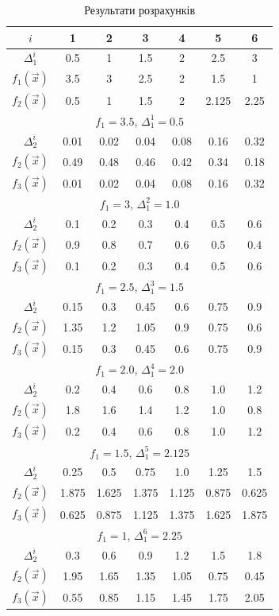 \clearpage
\begin{table}[H]        
    \caption{Результати розрахунків}
	\label{tab:result}
    \small
\begin{tabular}{c|cccccc}
	$i$ & 1 & 2 & 3 & 4 & 5 & 6 \\
	\hline
	$\Delta_1^i$ & 0.5 & 1 & 1.5 & 2 & 2.5 & 3 \\
	$f_1(\vec{x})$ & 3.5&	3	&2.5	&2	&1.5	&1 \\
	$f_2(\vec{x})$ & 0.5&	1	&1.5&	2	&2.125&	2.25 \\
	\hline
	\multicolumn{7}{c}{$f_1=3.5$, $\Delta_1^1=0.5$} \\
	\hline
	$\Delta_2^i$ & 0.01&	0.02&	0.04&	0.08&	0.16&	0.32 \\
	$f_2(\vec{x})$ & 0.49&	0.48&	0.46&	0.42&	0.34&	0.18 \\
	$f_3(\vec{x})$ & 0.01&	0.02&	0.04&	0.08&	0.16&	0.32 \\
	\hline
	\multicolumn{7}{c}{$f_1=3$, $\Delta_1^2=1.0$} \\
	\hline
	$\Delta_2^i$ & 0.1&	0.2&	0.3&	0.4&	0.5&	0.6 \\
	$f_2(\vec{x})$ & 0.9&	0.8&	0.7&	0.6&	0.5&	0.4 \\
	$f_3(\vec{x})$ & 0.1&	0.2&	0.3&	0.4&	0.5&	0.6 \\
	\hline
	\multicolumn{7}{c}{$f_1=2.5$, $\Delta_1^3=1.5$} \\
	\hline
	$\Delta_2^i$ & 0.15&	0.3&	0.45&	0.6&	0.75&	0.9 \\
	$f_2(\vec{x})$ & 1.35&	1.2&	1.05&	0.9&	0.75&	0.6 \\
	$f_3(\vec{x})$ & 0.15&	0.3&	0.45&	0.6&	0.75&	0.9 \\
	\hline
	\multicolumn{7}{c}{$f_1=2.0$, $\Delta_1^4=2.0$} \\
	\hline
	$\Delta_2^i$ & 0.2&	0.4&	0.6&	0.8&	1.0&	1.2 \\
	$f_2(\vec{x})$ & 1.8&	1.6&	1.4&	1.2&	1.0&	0.8 \\
	$f_3(\vec{x})$ & 0.2&	0.4&	0.6&	0.8&	1.0&	1.2 \\
	\hline
	\multicolumn{7}{c}{$f_1=1.5$, $\Delta_1^5=2.125$} \\
	\hline
	$\Delta_2^i$ & 0.25&	0.5&	0.75&	1.0&	1.25&	1.5 \\
	$f_2(\vec{x})$ & 1.875&	1.625&	1.375&	1.125&	0.875&	0.625 \\
	$f_3(\vec{x})$ & 0.625&	0.875&	1.125&	1.375&	1.625&	1.875 \\
	\hline
	\multicolumn{7}{c}{$f_1=1$, $\Delta_1^6=2.25$} \\
	\hline
	$\Delta_2^i$ & 0.3&	0.6&	0.9&	1.2&	1.5&	1.8 \\
	$f_2(\vec{x})$ & 1.95&	1.65&	1.35&	1.05&	0.75&	0.45 \\
	$f_3(\vec{x})$ & 0.55&	0.85&	1.15&	1.45&	1.75&	2.05 \\
\end{tabular}
\end{table}


